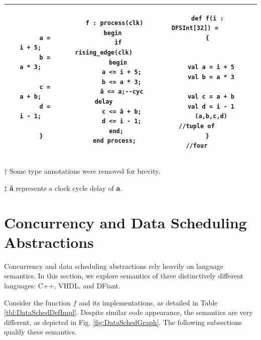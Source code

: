 \begin{table}[t]
\begin{threeparttable}
\begin{tabular}{|c|c|c|c|c|}
\begin{minipage}[b]{0.18\linewidth}
\begin{verbatim}
      
        a = i + 5;
        b = a * 3;
      
        c = a + b;
        d = i - 1;

      }
		\end{verbatim}
	\end{minipage}
	&
	\begin{minipage}[b]{0.18\linewidth}
		\begin{verbatim}
      f : process(clk)
      begin 
        if rising_edge(clk)
        begin
          a <= i + 5;
          b <= a * 3;
          â <= a;--cyc delay
          c <= â + b;
          d <= i - 1;
        end; 
      end process;
		\end{verbatim}
	\end{minipage}
	&
	\begin{minipage}[b]{0.19\linewidth}
		\begin{verbatim}
      def f(i : DFSInt[32]) = 
      {
      
      
        val a = i + 5
        val b = a * 3
      
        val c = a + b
        val d = i - 1
        (a,b,c,d) //tuple of
      }           //four
		\end{verbatim}
	\end{minipage}
  \\
  \hline
  \end{tabular}
  \begin{tablenotes}
    \item [†] Some type annotations were removed for brevity.
    \item [‡] \textbf{â} represents a clock cycle delay of \textbf{a}.
  \end{tablenotes}
  \end{threeparttable}
\end{table}%

\section{Concurrency and Data Scheduling Abstractions}
\label{sec:concurrency_abstractions}

Concurrency and data scheduling abstractions rely heavily on language semantics. In this section, we explore semantics of three distinctively different languages: C++, VHDL, and DFiant. 

Consider the function $f$ and its implementations, as detailed in Table \ref{tbl:DataSchedDefImpl}. Despite similar code appearance, the semantics are very different, as depicted in Fig. \ref{fig:DataSchedGraph}. The following subsections qualify these semantics.


